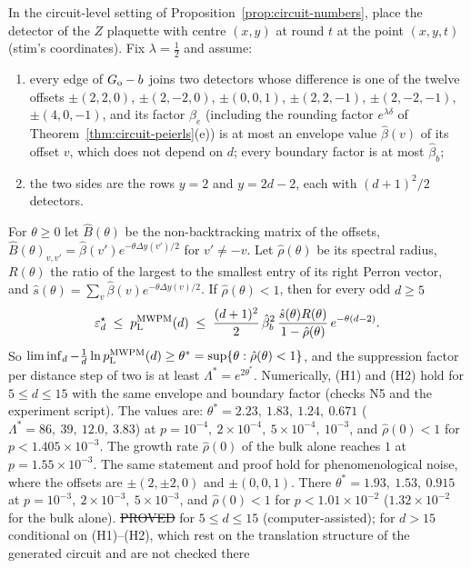 \begin{proposition}\label{prop:circuit-lattice}
In the circuit-level setting of Proposition~\ref{prop:circuit-numbers}, place the detector of the $Z$ plaquette with centre $(x,y)$ at round $t$ at the point $(x,y,t)$ (stim's coordinates). Fix $\lambda=\tfrac12$ and assume:
\begin{enumerate}[(H1)]
\item every edge of $G_{\rm o}-b$ joins two detectors whose difference is one of the twelve offsets $\pm(2,2,0)$, $\pm(2,-2,0)$, $\pm(0,0,1)$, $\pm(2,2,-1)$, $\pm(2,-2,-1)$, $\pm(4,0,-1)$, and its factor $\beta_e$ (including the rounding factor $e^{\lambda\delta}$ of Theorem~\ref{thm:circuit-peierls}(e)) is at most an envelope value $\hat\beta(v)$ of its offset $v$, which does not depend on $d$; every boundary factor is at most $\hat\beta_b$;
\item the two sides are the rows $y=2$ and $y=2d-2$, each with $(d+1)^2/2$ detectors.
\end{enumerate}
For $\theta\ge0$ let $\hat B(\theta)$ be the non-backtracking matrix of the offsets, $\hat B(\theta)_{v,v'}=\hat\beta(v')e^{-\theta\Delta y(v')/2}$ for $v'\ne-v$. Let $\hat\rho(\theta)$ be its spectral radius, $R(\theta)$ the ratio of the largest to the smallest entry of its right Perron vector, and $\hat s(\theta)=\sum_v\hat\beta(v)e^{-\theta\Delta y(v)/2}$. If $\hat\rho(\theta)<1$, then for every odd $d\ge5$
\[
\varepsilon^{\star}_d\;\le\;p_{\mathrm{L}}^{\rm MWPM}(d)\;\le\;\frac{(d+1)^2}{2}\,\hat\beta_b^2\,\frac{\hat s(\theta)R(\theta)}{1-\hat\rho(\theta)}\,e^{-\theta(d-2)}.
\]
So $\liminf_d-\tfrac1d\ln p_{\mathrm{L}}^{\rm MWPM}(d)\ge\theta^\ast=\sup\{\theta:\hat\rho(\theta)<1\}$, and the suppression factor per distance step of two is at least $\Lambda^\ast=e^{2\theta^\ast}$.
Numerically, (H1) and (H2) hold for $5\le d\le15$ with the same envelope and boundary factor (checks N5 and the experiment script). The values are:
$\theta^\ast=2.23,\ 1.83,\ 1.24,\ 0.671$ ($\Lambda^\ast=86,\ 39,\ 12.0,\ 3.83$) at $p=10^{-4},\ 2\times10^{-4},\ 5\times10^{-4},\ 10^{-3}$, and $\hat\rho(0)<1$ for $p<1.405\times10^{-3}$. The growth rate $\hat\rho(0)$ of the bulk alone reaches $1$ at $p=1.55\times10^{-3}$.
The same statement and proof hold for phenomenological noise, where the offsets are $\pm(2,\pm2,0)$ and $\pm(0,0,1)$. There $\theta^\ast=1.93,\ 1.53,\ 0.915$ at $p=10^{-3},\ 2\times10^{-3},\ 5\times10^{-3}$, and $\hat\rho(0)<1$ for $p<1.01\times10^{-2}$ ($1.32\times10^{-2}$ for the bulk alone).
\hfill\st{PROVED} for $5\le d\le15$ (computer-assisted); for $d>15$ conditional on (H1)--(H2), which rest on the translation structure of the generated circuit and are not checked there
\end{proposition}
